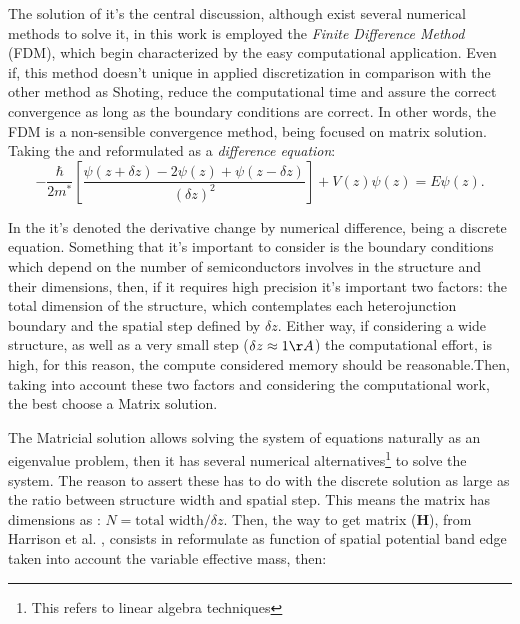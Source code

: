 The solution of  it's the central discussion, although exist several numerical methods to solve it, in this work is employed the \emph{Finite Difference Method} (\gls{FDM}), which begin characterized by the easy computational application. Even if, this method doesn't unique in applied discretization in comparison with the other method as Shoting\cite{killingbeck2020microcomputer,harrison2016quantum}, reduce the computational time and assure the correct convergence as long as the boundary conditions are correct. In other words, the \gls{FDM} is a non-sensible convergence method, being focused on matrix solution.  Taking the  and reformulated as a \emph{difference equation}\cite{harrison2016quantum}:
\begin{equation}\label{eqn:chapter-2-sec-numerical-calculations-schrodinger-discrete}
	-\dfrac{\hbar}{2m^{*}}\left[\dfrac{\psi(z+\delta z)-2\psi(z)+\psi(z-\delta z)}{(\delta z)^2}\right] + V(z)\psi(z)=E\psi(z).
\end{equation}

In the  it's denoted the derivative change by numerical difference,  being a discrete equation. Something that it's important to consider is the boundary conditions which depend on the number of semiconductors involves in the structure and their dimensions, then, if it requires high precision it's important two factors: the total dimension of the structure, which contemplates each heterojunction boundary and the spatial step defined by $\delta z$. Either way, if considering a wide structure, as well as a very small step ($\delta z \approx 1\AA$) the computational effort, is high, for this reason, the compute considered memory should be reasonable.Then, taking into account these two factors and considering the computational work, the best choose a Matrix solution.

The Matricial solution allows solving the system of equations naturally as an eigenvalue problem, then it has several numerical alternatives\footnote{This refers to linear algebra techniques\cite{harrison2016quantum,davidson1993monster}} to solve the system. The reason to assert these has to do with the discrete solution as large as the ratio between structure width and spatial step. This means the matrix has  dimensions as : $N = \text{total width}/\delta z$. Then, the way to get matrix ($\textbf{H}$), from Harrison et al. \cite{harrison2016quantum}, consists in reformulate   as function of spatial potential band edge taken into account the variable effective mass, then:

